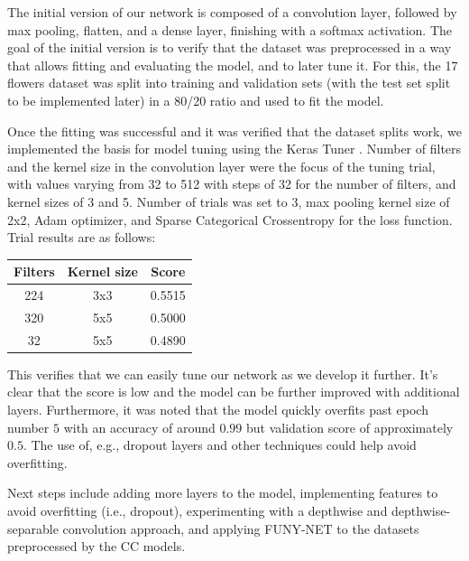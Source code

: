 The initial version of our network is composed of a convolution layer, followed by max pooling, flatten, and a dense layer, finishing with a softmax activation.
The goal of the initial version is to verify that the dataset was preprocessed in a way that allows fitting and evaluating the model, and to later tune it.
For this, the 17 flowers dataset was split into training and validation sets (with the test set split to be implemented later) in a 80/20 ratio and used to fit the model.

Once the fitting was successful and it was verified that the dataset splits work, we implemented the basis for model tuning using the Keras Tuner \cite{omalley2019kerastuner}.
Number of filters and the kernel size in the convolution layer were the focus of the tuning trial, with values varying from 32 to 512 with steps of 32 for the number of filters, and kernel sizes of 3 and 5.
Number of trials was set to 3, max pooling kernel size of 2x2, Adam optimizer, and Sparse Categorical Crossentropy for the loss function. Trial results are as follows:

\begin{tabular}{c|c|c}
    Filters & Kernel size & Score  \\
    \hline
    \hline
    224     & 3x3         & 0.5515 \\
    \hline
    320     & 5x5         & 0.5000 \\
    \hline
    32      & 5x5         & 0.4890
\end{tabular}

This verifies that we can easily tune our network as we develop it further. It's clear that the score is low and the model can be further improved with additional layers.
Furthermore, it was noted that the model quickly overfits past epoch number $5$ with an accuracy of around $0.99$ but validation score of approximately $0.5$.
The use of, e.g., dropout layers and other techniques could help avoid overfitting.

Next steps include adding more layers to the model, implementing features to avoid overfitting (i.e., dropout), experimenting with a depthwise and depthwise-separable convolution approach, and applying FUNY-NET to the datasets preprocessed by the CC models.